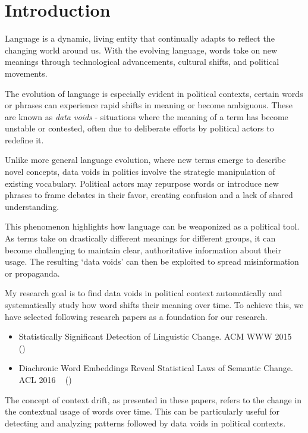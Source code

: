 
\section{Introduction} \label{sec:introduction}
Language is a dynamic, living entity that continually adapts to reflect the changing world around us.
With the evolving language, words take on new meanings through technological advancements, cultural shifts, and political movements.

The evolution of language is especially evident in political contexts, certain words or phrases can experience rapid shifts in meaning or become ambiguous.
These are known as \emph{data voids} - situations where the meaning of a term has become unstable or contested, often due to deliberate efforts by political actors to redefine it.

Unlike more general language evolution, where new terms emerge to describe novel concepts, data voids in politics involve the strategic manipulation of existing vocabulary.
Political actors may repurpose words or introduce new phrases to frame debates in their favor, creating confusion and a lack of shared understanding.

This phenomenon highlights how language can be weaponized as a political tool.
As terms take on drastically different meanings for different groups, it can become challenging to maintain clear, authoritative information about their usage.
The resulting `data voids' can then be exploited to spread misinformation or propaganda.

My research goal is to find data voids in political context automatically and systematically study how word shifts their meaning over time.
To achieve this, we have selected following research papers as a foundation for our research.

\begin{itemize}
    \item Statistically Significant Detection of Linguistic Change.
    ACM WWW 2015 ~\cite{kulkarni2014statisticallysignificantdetectionlinguistic} ()
    \item Diachronic Word Embeddings Reveal Statistical Laws of Semantic Change.
    ACL 2016 ~\cite{hamilton-etal-2016-diachronic} ()
\end{itemize}

The concept of context drift, as presented in these papers, refers to the change in the contextual usage of words over time.
This can be particularly useful for detecting and analyzing patterns followed by data voids in political contexts.


